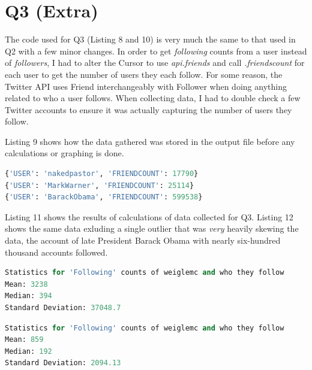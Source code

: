 \documentclass[12pt]{article}
\begin{document}
\section*{Q3 (Extra)}

The code used for Q3 (Listing 8 and 10) is very much the same to that used in Q2 with a few minor changes. In order to get \emph{following} counts from a user instead of \emph{followers}, I had to alter the Cursor to use \emph{api.friends} and call \emph{.friends\textunderscore count} for each user to get the number of users they each follow. For some reason, the Twitter API uses Friend interchangeably with Follower when doing anything related to who a user follows. When collecting data, I had to double check a few Twitter accounts to ensure it was actually capturing the number of users they follow.  



Listing 9 shows how the data gathered was stored in the output file before any calculations or graphing is done.

\begin{lstlisting}[language=Python, caption={Examples of stored dictionaries for accounts followed}, label=lst:copy]
{'USER': 'nakedpastor', 'FRIENDCOUNT': 17790}
{'USER': 'MarkWarner', 'FRIENDCOUNT': 25114}
{'USER': 'BarackObama', 'FRIENDCOUNT': 599538}
\end{lstlisting}




Listing 11 shows the results of calculations of data collected for Q3. Listing 12 shows the same data exluding a single outlier that was \emph{very} heavily skewing the data, the account of late President Barack Obama with nearly six-hundred thousand accounts followed.

\begin{lstlisting}[language=Python, caption={Calculated mean, median, and standard deviation for Q3}, label=lst:copy]
Statistics for 'Following' counts of weiglemc and who they follow
Mean: 3238
Median: 394
Standard Deviation: 37048.7
\end{lstlisting}

\begin{lstlisting}[language=Python, caption={Calculated mean, median, and standard deviation for Q3, excluding an outlier}, label=lst:copy]
Statistics for 'Following' counts of weiglemc and who they follow
Mean: 859
Median: 192
Standard Deviation: 2094.13
\end{lstlisting}
\end{document}
